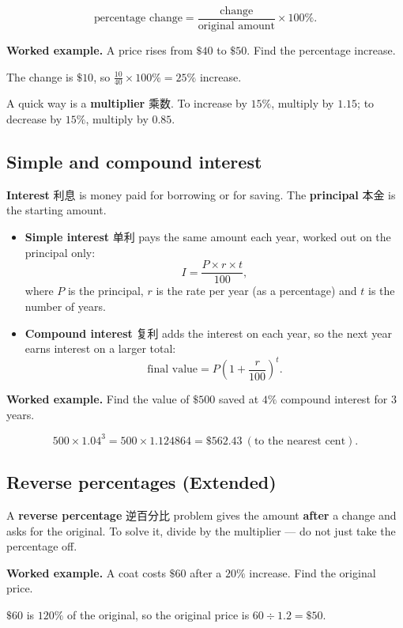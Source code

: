 \documentclass[11pt]{article}
\begin{document}
\[
\text{percentage change} = \frac{\text{change}}{\text{original amount}} \times 100\%.
\]

\textbf{Worked example.} A price rises from $\$40$ to $\$50$. Find the percentage increase.

The change is $\$10$, so $\frac{10}{40} \times 100\% = 25\%$ increase.

A quick way is a \textbf{multiplier} 乘数. To increase by $15\%$, multiply by $1.15$; to decrease by $15\%$, multiply by $0.85$.

\subsection*{Simple and compound interest}

\textbf{Interest} 利息 is money paid for borrowing or for saving. The \textbf{principal} 本金 is the starting amount.

\begin{itemize}
\item \textbf{Simple interest} 单利 pays the same amount each year, worked out on the principal only: \[I = \frac{P \times r \times t}{100},\] where $P$ is the principal, $r$ is the rate per year (as a percentage) and $t$ is the number of years.

\item \textbf{Compound interest} 复利 adds the interest on each year, so the next year earns interest on a larger total: \[\text{final value} = P\left(1 + \frac{r}{100}\right)^{t}.\]

\end{itemize}

\textbf{Worked example.} Find the value of $\$500$ saved at $4\%$ compound interest for $3$ years.

\[
500 \times 1.04^{3} = 500 \times 1.124864 = \$562.43 \ (\text{to the nearest cent}).
\]

\subsection*{Reverse percentages (Extended)}

A \textbf{reverse percentage} 逆百分比 problem gives the amount \textbf{after} a change and asks for the original. To solve it, divide by the multiplier — do not just take the percentage off.

\textbf{Worked example.} A coat costs $\$60$ after a $20\%$ increase. Find the original price.

$\$60$ is $120\%$ of the original, so the original price is $60 \div 1.2 = \$50$.
\end{document}

